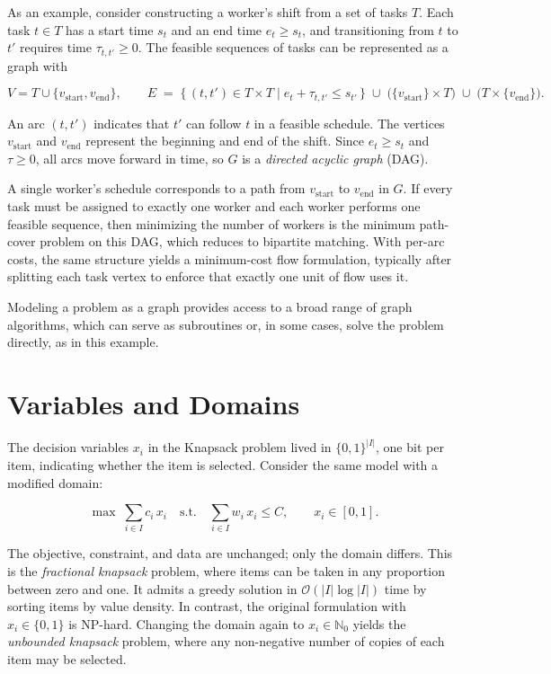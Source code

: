 As an example, consider constructing a worker's shift from a set of
tasks \(T\). Each task \(t \in T\) has a start time \(s_t\) and an end
time \(e_t \ge s_t\), and transitioning from \(t\) to \(t'\) requires
time \(\tau_{t,t'} \ge 0\). The feasible sequences of tasks can be
represented as a graph with

\[
V = T \cup \{v_{\text{start}}, v_{\text{end}}\}, \qquad
E \;=\; \bigl\{\, (t, t') \in T \times T \;\big|\; e_t + \tau_{t,t'} \le s_{t'} \,\bigr\}
\;\cup\; \bigl(\{v_{\text{start}}\} \times T\bigr)
\;\cup\; \bigl(T \times \{v_{\text{end}}\}\bigr).
\]

An arc \((t, t')\) indicates that \(t'\) can follow \(t\) in a feasible
schedule. The vertices \(v_{\text{start}}\) and \(v_{\text{end}}\)
represent the beginning and end of the shift. Since \(e_t \ge s_t\) and
\(\tau \ge 0\), all arcs move forward in time, so \(G\) is a
\emph{directed acyclic graph} (DAG).

A single worker's schedule corresponds to a path from
\(v_{\text{start}}\) to \(v_{\text{end}}\) in \(G\). If every task must
be assigned to exactly one worker and each worker performs one feasible
sequence, then minimizing the number of workers is the minimum
path-cover problem on this DAG, which reduces to bipartite matching.
With per-arc costs, the same structure yields a minimum-cost flow
formulation, typically after splitting each task vertex to enforce that
exactly one unit of flow uses it.

\begin{platypustip}
Modeling a problem as a graph provides access to a broad
range of graph algorithms, which can serve as subroutines or, in some
cases, solve the problem directly, as in this example.
\end{platypustip}

\section{Variables and Domains}\label{sec:2.4}

The decision variables \(x_i\) in the Knapsack problem lived in
\(\{0, 1\}^{|I|}\), one bit per item, indicating whether the item is
selected. Consider the same model with a modified domain:

\[
\max \;\sum_{i \in I} c_i\, x_i
\quad\text{s.t.}\quad
\sum_{i \in I} w_i\, x_i \le C,
\qquad x_i \in [0, 1].
\]

The objective, constraint, and data are unchanged; only the domain
differs. This is the \emph{fractional knapsack} problem, where items can
be taken in any proportion between zero and one. It admits a greedy
solution in \(\mathcal{O}(|I| \log |I|)\) time by sorting items by value
density. In contrast, the original formulation with \(x_i \in \{0,1\}\)
is NP-hard. Changing the domain again to \(x_i \in \mathbb{N}_0\) yields
the \emph{unbounded knapsack} problem, where any non-negative number of
copies of each item may be selected.

